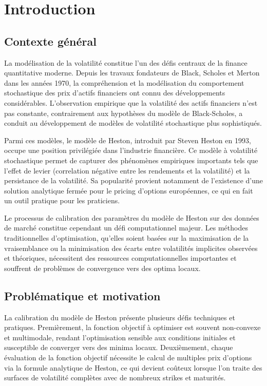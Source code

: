 \chapter{Introduction}

\section{Contexte général}

La modélisation de la volatilité constitue l'un des défis centraux de la finance quantitative moderne. Depuis les travaux fondateurs de Black, Scholes et Merton dans les années 1970, la compréhension et la modélisation du comportement stochastique des prix d'actifs financiers ont connu des développements considérables. L'observation empirique que la volatilité des actifs financiers n'est pas constante, contrairement aux hypothèses du modèle de Black-Scholes, a conduit au développement de modèles de volatilité stochastique plus sophistiqués.

Parmi ces modèles, le modèle de Heston, introduit par Steven Heston en 1993, occupe une position privilégiée dans l'industrie financière. Ce modèle à volatilité stochastique permet de capturer des phénomènes empiriques importants tels que l'effet de levier (correlation négative entre les rendements et la volatilité) et la persistance de la volatilité. Sa popularité provient notamment de l'existence d'une solution analytique fermée pour le pricing d'options européennes, ce qui en fait un outil pratique pour les praticiens.

Le processus de calibration des paramètres du modèle de Heston sur des données de marché constitue cependant un défi computationnel majeur. Les méthodes traditionnelles d'optimisation, qu'elles soient basées sur la maximisation de la vraisemblance ou la minimisation des écarts entre volatilités implicites observées et théoriques, nécessitent des ressources computationnelles importantes et souffrent de problèmes de convergence vers des optima locaux.

\section{Problématique et motivation}

La calibration du modèle de Heston présente plusieurs défis techniques et pratiques. Premièrement, la fonction objectif à optimiser est souvent non-convexe et multimodale, rendant l'optimisation sensible aux conditions initiales et susceptible de converger vers des minima locaux. Deuxièmement, chaque évaluation de la fonction objectif nécessite le calcul de multiples prix d'options via la formule analytique de Heston, ce qui devient coûteux lorsque l'on traite des surfaces de volatilité complètes avec de nombreux strikes et maturités.

